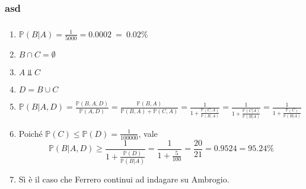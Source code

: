 \subsubsection{asd}
\subsubsection{}
\begin{enumerate}
\item $\mathbb{P}( B|A) =\frac{1}{5000} =0.0002\ =\ 0.02\%$
\item $B\cap C=\emptyset $
\item $A\Bot C$
\item $D=B\cup C$
\item $\mathbb{P}( B|A,D) =\frac{\mathbb{P}( B,A,D)}{\mathbb{P}( A,D)} =\frac{\mathbb{P}( B,A)}{\mathbb{P}( B,A) +\mathbb{P}( C,A)} =\frac{1}{1+\frac{\mathbb{P}( C,A)}{\mathbb{P}( B,A)}} =\frac{1}{1+\frac{\mathbb{P}( C|A)}{\mathbb{P}( B|A)}} =\frac{1}{1+\frac{\mathbb{P}( C)}{\mathbb{P}( B|A)}}$
\item Poiché $\mathbb{P}( C) \leq \mathbb{P}( D) =\frac{1}{100000}$, vale\begin{equation*}
\mathbb{P}( B|A,D) \geq \frac{1}{1+\frac{\mathbb{P}( D)}{\mathbb{P}( B|A)}} =\frac{1}{1+\frac{5}{100}} =\frac{20}{21} =0.9524=95.24\%
\end{equation*}
\item Sì è il caso che Ferrero continui ad indagare su Ambrogio.
\end{enumerate}
\subsubsection{}

